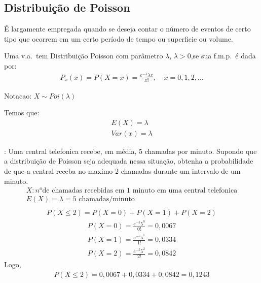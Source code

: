 \subsection{Distribuição de Poisson}
\begin{description}
  \item É largamente empregada quando se deseja contar o número de eventos de certo tipo
que ocorrem em um certo período de tempo ou superficie ou volume.
\item[Definicao] Uma v.a.\ tem Distribuição Poisson com parâmetro $\lambda$, $\lambda >0$,se sua
  f.m.p.\ é dada por:
 \begin{align}
   P_{x} (x)= P(X=x)= \frac{e^{-\lambda}\lambda{x}}{x!}, \quad x=0,1,2,\ldots
 \end{align} 
 \item{Notacao}: $X \mathtt{\sim} Poi(\lambda)$
 \item{Temos que}:
   \begin{align}
     E(X)= \lambda \\
     Var(x)= \lambda
   \end{align}
   \item[Exemplo]: Uma central telefonica recebe, em média, 5 chamadas por minuto.
     Supondo que a distribuição de Poisson seja adequada nessa situação, obtenha a 
     probabilidade de que a central receba no maximo 2 chamadas durante um intervalo
     de um minuto.
     \begin{align*}
       X: n^{o} \text{de chamadas recebidas em 1 minuto em uma central telefonica}
       \\
       E(X)=\lambda= \text{5 chamadas/minuto}\\
     \end{align*}
     \begin{align*}
       P(X \leq 2)= P(X=0)+ P(X=1)+P(X=2)
     \end{align*}
     \begin{align*}
       P(X=0) = \frac{e^{-5}5^0}{0!}= 0,0067\\
       P(X=1) = \frac{e^{-5}5^1}{1!}= 0,0334\\
       P(X=2) = \frac{e^{-5}5^2}{2!}= 0,0842
     \end{align*}
     Logo,
     \begin{align*}
       P(X \leq 2)= 0,0067+0,0334+0,0842=0,1243
     \end{align*}
   \end{description}
